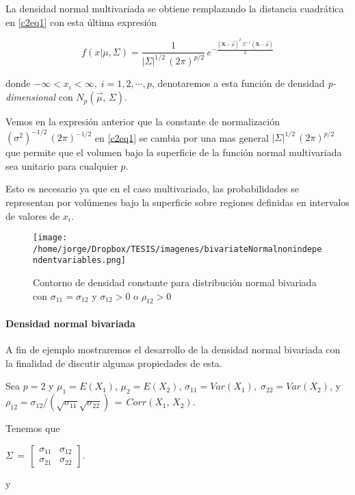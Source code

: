 \documentclass[english]{report}
\begin{document}
La densidad normal multivariada se obtiene remplazando la distancia cuadrática en \ref{c2eq1} con esta última expresión

\begin{equation}
f(x|\mu,\Sigma)=\frac{1}{|\Sigma|^{1/2}\,(2\pi)^{p/2}}\,e^{-\frac{(\textbf{X}-\vec{\mu})^T\,\Sigma^{-1}\,(\textbf{X}-\vec{\mu})}{2}}
\label{c2eq13}
\end{equation}

donde $-\infty <  x_i < \infty,\;i=1,2,\cdots,p$, denotaremos a esta función de densidad \emph{p-dimensional}  con $N_p(\vec{\mu},\,\Sigma)$.

Vemos en la expresión anterior que la constante de normalización $(\sigma^2)^{-1/2}\,(2\pi)^{-1/2}$ en \ref{c2eq1} se cambia por una mas general $|\Sigma|^{1/2}\,(2\pi)^{p/2}$ que permite que el volumen bajo la superficie de la función normal multivariada sea unitario para cualquier $p$.

Esto es necesario ya que en el caso multivariado, las probabilidades se representan por volúmenes bajo la superficie sobre regiones definidas en intervalos de valores de $x_i$.

\begin{figure}[H]
\centering
\texttt{[image: /home/jorge/Dropbox/TESIS/imagenes/bivariateNormalnonindependentvariables.png]}
\caption{Contorno de densidad constante para distribución normal bivariada con $\sigma_{11}=\sigma_{12}$ y $\sigma_{12} > 0$ o $\rho_{12} > 0$}
\label{c2f3}
\end{figure}

\paragraph{Densidad normal bivariada}

A fin de ejemplo mostraremos el desarrollo de la densidad normal bivariada con la finalidad de discutir algunas propiedades de esta.


Sea $p=2$ y $\mu_1=E(X_1)$, $\mu_2=E(X_2)$, $\sigma_{11} = Var(X_1),\;\sigma_{22}=Var(X_2)$, y $\rho_{12} = \sigma_{12}/(\sqrt{\sigma_{11}}\sqrt{\sigma_{22}})\,=\,Corr(X_1,\,X_2)$.  


Tenemos que


$\Sigma\,=\,\begin{bmatrix}\sigma_{11}&\sigma_{12}\\\sigma_{21}&\sigma_{22}\end{bmatrix}$.


y 
\end{document}
